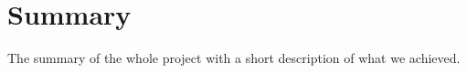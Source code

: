 \section*{Summary}
The summary of the whole project with a short description of what we achieved.   